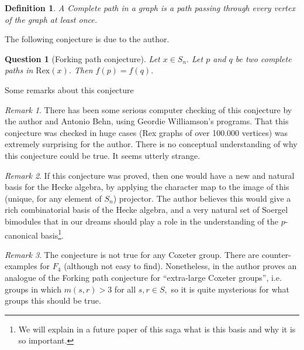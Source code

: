 \documentclass[12pt]{wart}
\newtheorem{defi}{Definition}
\newtheorem{ques}[thm]{Question}
\theoremstyle{remark}
\newtheorem{remark}{Remark}
\begin{document}
\begin{defi} A \emph{Complete path} in a graph is a path passing through every vertex of the graph at least once. 
\end{defi}



The following conjecture is due to the author. 


\begin{ques}[Forking path conjecture] Let $x\in S_n.$  Let $p$ and $q$ be two complete paths in $\mathrm{Rex}(x)$. Then $f(p)=f(q).$
\end{ques}
Some remarks about this conjecture

\begin{remark} 
There has been some serious computer checking of this conjecture  by the author and Antonio Behn, using Geordie Williamson's programs.  That this conjecture was checked in huge cases (Rex graphs of over 100.000 vertices) was extremely surprising for the author. There is no  conceptual understanding of why this conjecture could be true. It seems utterly strange. 
\end{remark}

\begin{remark}
 If this conjecture was proved, then one would have a new and natural basis for the Hecke algebra, by applying the character map to the image of this (unique, for any element of $S_n$) projector. The author believes this would give a  rich combinatorial basis of the Hecke algebra, and a very natural set of Soergel bimodules that in our dreams should play a role in the understanding of the $p$-canonical basis\footnote{We will explain in a future paper of this saga what is this basis and why it is so important.}.
\end{remark}

\begin{remark}
The conjecture is not true for any Coxeter group. There are counter-examples for $F_4$ (although not easy to find). Nonetheless, in \cite{li2.5} the author proves an analogue of the Forking path conjecture for ``extra-large Coxeter groups'', i.e. groups in which $m(s,r)>3$ for all $s,r\in S, $ so it is quite mysterious for what groups this should be true. 
\end{remark}
\end{document}
